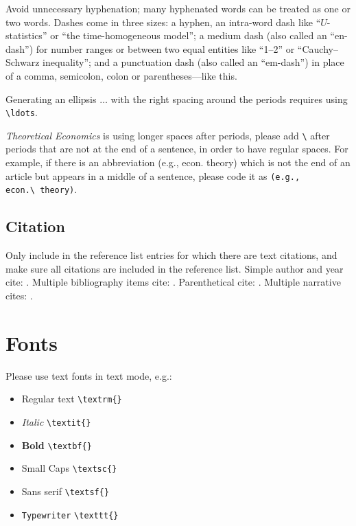 \documentclass[qe,nameyear,final,openaccess]{econsocart}
\theoremstyle{plain}
\begin{document}
Avoid unnecessary hyphenation; many hyphenated words can be treated as one or two words.
Dashes come in three sizes: a hyphen, an intra-word dash like ``$U$-statistics'' or ``the time-homogeneous model'';
a medium dash (also called an ``en-dash'') for number ranges or between two equal entities like ``1--2'' or ``Cauchy--Schwarz inequality'';
and a punctuation dash (also called an ``em-dash'') in place of a comma, semicolon,
colon or parentheses---like this.

Generating an ellipsis $\ldots$ with the right spacing
around the periods requires using \texttt{{\textbackslash}ldots}.

\textit{Theoretical Economics} is using longer spaces after periods, please add \texttt{{\textbackslash}} after periods that are not at the end of a sentence, in order to have regular spaces. For example, if there is an abbreviation (e.g., econ. theory) which is not the end of an article but appears in a middle of a sentence, please code it as \texttt{(e.g., econ.{\textbackslash}~theory)}.

\subsection{Citation}

Only include in the reference list entries for which there are text citations,
and make sure all citations are included in the reference list.
Simple author and year cite: \citet{b1}.
Multiple bibliography items cite: \citet{b2, b3, b4, b5}.
Parenthetical cite: \citep{b1}.
Multiple narrative cites: \citet{b2, b3, b4}.

\section{Fonts}

Please use text fonts in text mode, e.g.:

\begin{itemize}
\item Regular text \texttt{{\textbackslash}textrm\{\}}
\item \textit{Italic} \texttt{{\textbackslash}textit\{\}}
\item \textbf{Bold} \texttt{{\textbackslash}textbf\{\}}
\item Small Caps \texttt{{\textbackslash}textsc\{\}}
\item Sans serif \texttt{{\textbackslash}textsf\{\}}
\item \texttt{Typewriter} \texttt{{\textbackslash}texttt\{\}}
\end{itemize}
\end{document}
